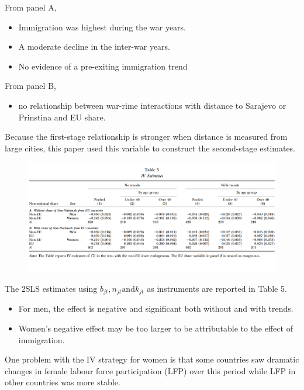 \documentclass[../root]{subfiles}
\begin{document}
    From panel A, 
    \begin{itemize}
        \item Immigration was highest during the war years.
        \item A moderate decline in the inter-war years.
        \item No evidence of a pre-exiting immigration trend
    \end{itemize}
    
    From panel B, 
    \begin{itemize}
        \item no relationship between war-rime interactions with distance to Sarajevo or Prinstina and EU share.
    \end{itemize}
    
    Because the first-stage relationship is stronger when distance is measured from large cities, this paper used this variable to construct the second-stage estimates. \\
    \begin{figure}[h]
        \includegraphics[width=15cm]{0529sugiyama/Table5.png}
    \end{figure}
    The 2SLS estimates using $b_{jt}, n_{jt} \mbox{and} k_{jt}$ as instruments are reported in Table 5. \\
    \begin{itemize}
        \item  For men, the effect is negative and significant both without and with trends.
        \item Women's negative effect may be too larger to be attributable to the effect of immigration.
    \end{itemize}
   
    One problem with the IV strategy for women is that some countries saw dramatic changes in female labour force participation (LFP) over this period while LFP in other countries was more stable.
\end{document}
